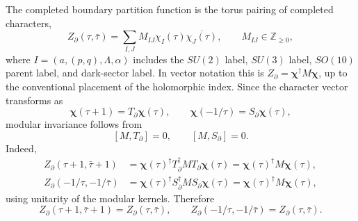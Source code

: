 \documentclass[11pt]{article}
\newcommand{\Zboundary}{Z_{\partial}}
\begin{document}
The completed boundary partition function is the torus pairing of completed
characters,
\begin{equation}
\label{eq:section-three-zboundary-completed}
 \Zboundary(\tau,\bar\tau)
 =
 \sum_{I,J}M_{IJ}\chi_I(\tau)\overline{\chi_J(\tau)},
 \qquad
 M_{IJ}\in\mathbb Z_{\ge0},
\end{equation}
where
$I=(a,(p,q),\Lambda,\alpha)$ includes the $SU(2)$ label, $SU(3)$ label,
$SO(10)$ parent label, and dark-sector label.  In vector notation this is
$\Zboundary=\boldsymbol\chi^{\dagger}M\boldsymbol\chi$, up to the conventional
placement of the holomorphic index.  Since the character vector transforms as
\begin{equation}
\label{eq:section-three-character-transform}
 \boldsymbol\chi(\tau+1)=T_{\partial}\boldsymbol\chi(\tau),
 \qquad
 \boldsymbol\chi(-1/\tau)=S_{\partial}\boldsymbol\chi(\tau),
\end{equation}
modular invariance follows from
\begin{equation}
\label{eq:section-three-commuting-m}
 [M,T_{\partial}]=0,
 \qquad
 [M,S_{\partial}]=0.
\end{equation}
Indeed,
\begin{align}
\label{eq:section-three-t-invariance-derivation}
 \Zboundary(\tau+1,\bar\tau+1)
 &=
 \boldsymbol\chi(\tau)^{\dagger}
 T_{\partial}^{\dagger}MT_{\partial}
 \boldsymbol\chi(\tau)
 =
 \boldsymbol\chi(\tau)^{\dagger}M\boldsymbol\chi(\tau),\\
\label{eq:section-three-s-invariance-derivation}
 \Zboundary(-1/\tau,-1/\bar\tau)
 &=
 \boldsymbol\chi(\tau)^{\dagger}
 S_{\partial}^{\dagger}MS_{\partial}
 \boldsymbol\chi(\tau)
 =
 \boldsymbol\chi(\tau)^{\dagger}M\boldsymbol\chi(\tau),
\end{align}
using unitarity of the modular kernels.  Therefore
\begin{equation}
\label{eq:section-three-z-modular-invariance}
 \boxed{
 \Zboundary(\tau+1,\bar\tau+1)=\Zboundary(\tau,\bar\tau),
 \qquad
 \Zboundary(-1/\tau,-1/\bar\tau)=\Zboundary(\tau,\bar\tau).}
\end{equation}
\end{document}
